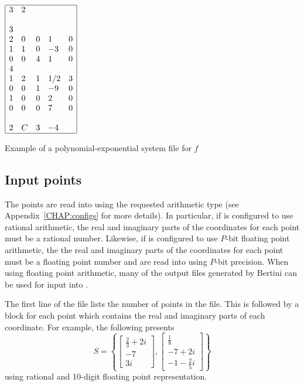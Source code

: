 \documentclass[11pt]{report}
\begin{document}
\begin{table}[h!]
\centering
$\begin{array}{|lllll|}
\hline
3 & 2 & & & \\
& & & & \\
3 & & & & \\
2 & 0 & 0 & 1  & 0 \\
1 & 1 & 0 & -3 & 0 \\
0 & 0 & 4 & 1  & 0 \\
4 & & & & \\
1 & 2 & 1 & 1/2 & 3 \\
0 & 0 & 1 & -9 & 0 \\
1 & 0 & 0 & 2 & 0 \\
0 & 0 & 0 & 7 & 0 \\
  &   &   &   &   \\
2 & C & 3 & -4 &  \\
\hline
\end{array}$
\caption{Example of a polynomial-exponential system file for $f$}\label{Tab:PolyExpSys}
\end{table}

\subsection{Input points}\label{SEC:Points}

The points are read into \alphaCertifiedS using the requested arithmetic type (see Appendix~\ref{CHAP:configs}
for more details).  In particular, if \alphaCertifiedS is configured to use rational arithmetic,
the real and imaginary parts of the coordinates for each point must be a rational number.
Likewise, if \alphaCertifiedS is configured to use $P$-bit floating point arithmetic, the
the real and imaginary parts of the coordinates for each point
must be a floating point number and are read into \alphaCertifiedS using $P$-bit precision.
When using floating point arithmetic, many of the output files
generated by Bertini \cite{Bertini} can be used for input into \alphaCertified.

The first line of the file lists the number of points in the file.
This is followed by a block for each point which contains the real and imaginary
parts of each coordinate.
For example, the following presents
$$S = \left\{\left[\begin{array}{c} \frac{2}{3}+2i \\ -7 \\ 3i \end{array}\right],
\left[\begin{array}{c} \frac{1}{8} \\ -7+2i \\ -1-\frac{2}{5}i \end{array}\right]\right\}$$
using rational and 10-digit floating point representation.
\end{document}
